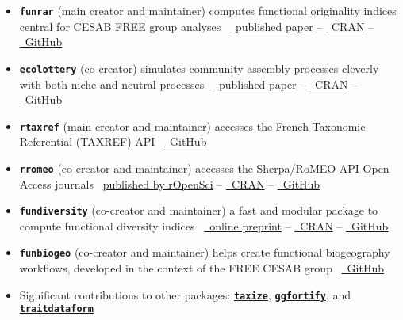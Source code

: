 \documentclass[10pt,a4paper,]{article}
\begin{document}
\begin{itemize}
\item
  \textbf{\texttt{funrar}} (main creator and maintainer)
  \hfill\break computes functional originality indices central for CESAB
  FREE group analyses
  \hfill\break ~\href{https://doi.org/10.1111/ddi.12629}{\faFile*~published
  paper} --
  \href{https://cran.r-project.org/package=funrar}{\faRProject~CRAN} --
  \href{https://github.com/Rekyt/funrar}{\faGithub~GitHub}
\item
  \textbf{\texttt{ecolottery}} (co-creator) \hfill\break simulates
  community assembly processes cleverly with both niche and neutral
  processes
  \hfill\break ~\href{https://doi.org/10.1111/2041-210X.12918}{\faFile*~published
  paper} --
  \href{https://cran.r-project.org/package=ecolottery}{\faRProject~CRAN}
  -- \href{https://github.com/frmunoz/ecolottery}{\faGithub~GitHub}
\item
  \textbf{\texttt{rtaxref}} (main creator and maintainer)
  \hfill\break accesses the French Taxonomic Referential (TAXREF) API
  \hfill\break ~\href{https://github.com/Rekyt/rtaxref}{\faGithub~GitHub}
\item
  \textbf{\texttt{rromeo}} (co-creator and maintainer)
  \hfill\break accesses the Sherpa/RoMEO API Open Access journals
  \hfill\break~\href{https://docs.ropensci.org/rromeo}{published by
  rOpenSci} --
  \href{https://cran.r-project.org/package=rromeo}{\faRProject~CRAN} --
  \href{https://github.com/ropensci/rromeo}{\faGithub~GitHub}
\item
  \textbf{\texttt{fundiversity}} (co-creator and maintainer)
  \hfill\break a fast and modular package to compute functional
  diversity indices
  \hfill\break ~\href{https:////doi.org/10.32942/osf.io/dg7hw}{\faFile*~online
  preprint} --
  \href{https://cran.r-project.org/package=fundiversity}{\faRProject~CRAN}
  -- \href{https://github.com/bisaloo/fundiversity}{\faGithub~GitHub}
\item
  \textbf{\texttt{funbiogeo}} (co-creator and maintainer)
  \hfill\break helps create functional biogeography workflows, developed
  in the context of the FREE CESAB group
  \hfill\break ~\href{https://github.com/FRBCesab/funbiogeo}{\faGithub~GitHub}
\item
  Significant contributions to other packages:
  \href{https://cran.r-project.org/package=taxize}{\textbf{\texttt{taxize}}},
  \href{https://cran.r-project.org/package=ggfortify}{\textbf{\texttt{ggfortify}}},
  and
  \href{https://cran.r-project.org/package=traitdataform}{\textbf{\texttt{traitdataform}}}
\end{itemize}
\end{document}

